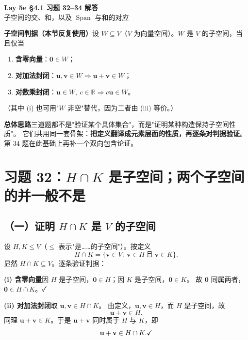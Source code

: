 \documentclass[11pt]{ctexart}
\newcommand{\Span}{\operatorname{Span}}
\newcommand{\0}{\mathbf{0}}
\begin{document}
\begin{center}
{\Large\bfseries Lay 5e \S4.1 习题 32--34 解答}\\[3pt]
{\small 子空间的交、和，以及 $\Span$ 与和的对应}
\end{center}

\vspace{0.1cm}

\begin{keybox}
\textbf{子空间判据（本节反复使用）}\quad 设 $W\subseteq V$（$V$ 为向量空间）。$W$ 是 $V$ 的子空间，当且仅当
\begin{enumerate}[label=(\roman*)]
\item \textbf{含零向量}：$\0\in W$；
\item \textbf{对加法封闭}：$\mathbf u,\mathbf v\in W\Rightarrow\mathbf u+\mathbf v\in W$；
\item \textbf{对数乘封闭}：$\mathbf u\in W,\ c\in\mathbb R\Rightarrow c\mathbf u\in W$。
\end{enumerate}
（其中 (i) 也可用"$W$ 非空"替代，因为二者由 (iii) 等价。）
\end{keybox}

\textbf{总体思路}\quad 三道题都不是"验证某个具体集合"，而是"证明某种构造保持子空间性质"。
它们共用同一套骨架：\textbf{把定义翻译成元素层面的性质，再逐条对判据验证}。
第 34 题在此基础上再补一个双向包含论证。

\section*{习题 32：$H\cap K$ 是子空间；两个子空间的并一般不是}

\subsection*{（一）证明 $H\cap K$ 是 $V$ 的子空间}

设 $H,K\le V$（$\le$ 表示"是……的子空间"）。按定义
\[
H\cap K=\{\mathbf v\in V:\ \mathbf v\in H\ \text{且}\ \mathbf v\in K\}.
\]
显然 $H\cap K\subseteq V$。逐条验证判据：

\textbf{(i) 含零向量}\quad 因 $H$ 是子空间，$\0\in H$；因 $K$ 是子空间，$\0\in K$。
故 $\0$ 同属两者，$\0\in H\cap K$。\hfill ✓

\textbf{(ii) 对加法封闭}\quad 取 $\mathbf u,\mathbf v\in H\cap K$。
由定义，$\mathbf u,\mathbf v\in H$，而 $H$ 是子空间，故
\[
\mathbf u+\mathbf v\in H .
\]
同理 $\mathbf u+\mathbf v\in K$。于是 $\mathbf u+\mathbf v$ 同时属于 $H$ 与 $K$，即
\[
\mathbf u+\mathbf v\in H\cap K . \hfill \checkmark
\]
\end{document}
